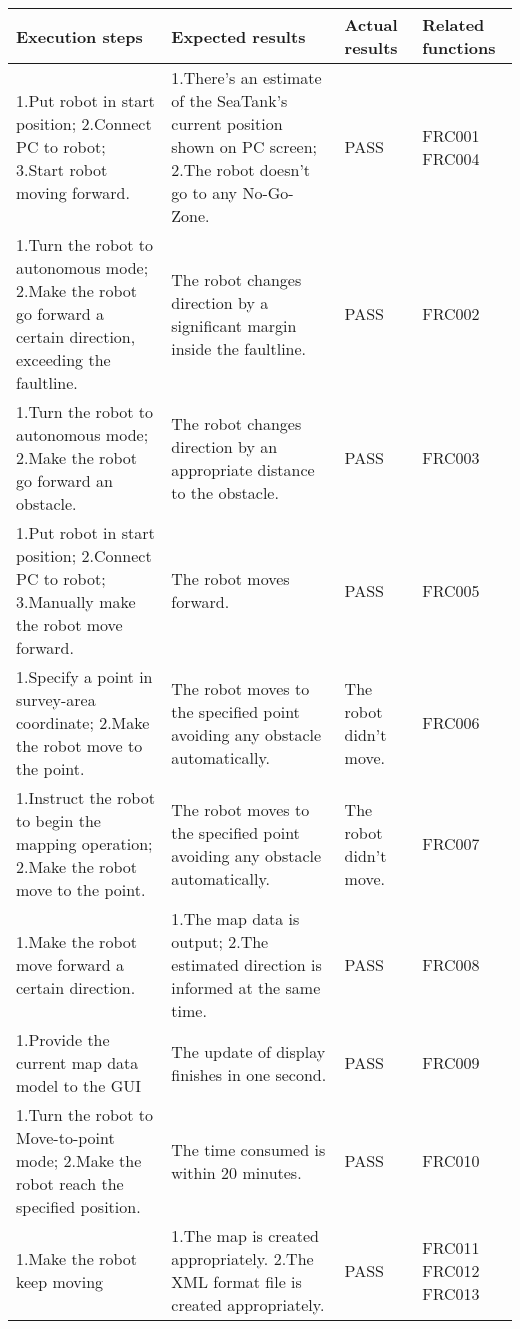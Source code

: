 \documentclass[12pt]{article}
\begin{document}
\begin{longtable}[H]{ | p{}| p{}| p{}|p{}| }
\hline
\textbf \textbf{Execution steps} &  \textbf\textbf{Expected results} &  \textbf\textbf{Actual results} &  \textbf\textbf{Related functions}  \\
\hline
1.Put robot in start position;
2.Connect PC to robot;
3.Start robot moving forward. & 1.There's an estimate of the SeaTank's current position shown on PC screen;
2.The robot doesn't go to any No-Go-Zone. & PASS & FRC001 FRC004\\
\hline
1.Turn the robot to autonomous mode;
2.Make the robot go forward a certain direction, exceeding the faultline. & The robot changes direction by a significant margin inside the faultline. & PASS & FRC002\\
\hline
1.Turn the robot to autonomous mode;
2.Make the robot go forward an obstacle. & The robot changes direction by an appropriate distance to the obstacle.& PASS &FRC003\\
\hline

1.Put robot in start position;
2.Connect PC to robot;
3.Manually make the robot move forward. & The robot moves forward.& PASS &FRC005\\
\hline


1.Specify a point in survey-area coordinate;
2.Make the robot move to the point. & The robot moves to the specified point avoiding any obstacle automatically.&  The robot didn't move.  &FRC006\\
\hline

1.Instruct the robot to begin the mapping operation;
2.Make the robot move to the point. &The robot moves to the specified point avoiding any obstacle automatically.&  The robot didn't move.  &FRC007\\
\hline

1.Make the robot move forward a certain direction. &1.The map data is output;
2.The estimated direction is informed at the same time.& PASS &FRC008\\
\hline


1.Provide the current map data model to the GUI&The update of display finishes in one second.& PASS &FRC009\\
\hline
1.Turn the robot to Move-to-point mode;
2.Make the robot reach the specified position.&The time consumed is within 20 minutes.& PASS &FRC010\\
\hline

1.Make the robot keep moving &1.The map is created appropriately.
2.The XML format file is created appropriately.& PASS &FRC011 FRC012 FRC013\\
\hline


\end{longtable}
\end{document}
